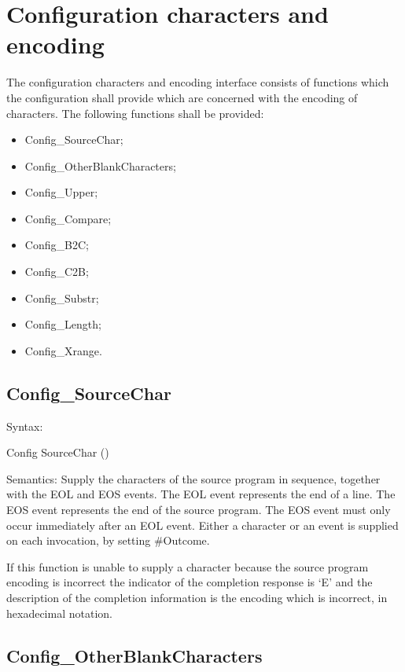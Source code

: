 \hypertarget{configuration-characters-and-encoding}{%
\section{Configuration characters and
encoding}\label{configuration-characters-and-encoding}}

The configuration characters and encoding interface consists of
functions which the configuration shall provide which are concerned with
the encoding of characters. The following functions shall be provided:

\begin{itemize}
\item
  Config\_SourceChar;
\item
  Config\_OtherBlankCharacters;
\item
  Config\_Upper;
\item
  Config\_Compare;
\item
  Config\_B2C;
\item
  Config\_C2B;
\item
  Config\_Substr;
\item
  Config\_Length;
\item
  Config\_Xrange.
\end{itemize}

\hypertarget{config_sourcechar}{%
\subsection{Config\_SourceChar}\label{config_sourcechar}}

Syntax:

Config SourceChar ()

Semantics: Supply the characters of the source program in sequence,
together with the EOL and EOS events. The EOL event represents the end
of a line. The EOS event represents the end of the source program. The
EOS event must only occur immediately after an EOL event. Either a
character or an event is supplied on each invocation, by setting
\#Outcome.

If this function is unable to supply a character because the source
program encoding is incorrect the indicator of the completion response
is `E' and the description of the completion information is the encoding
which is incorrect, in hexadecimal notation.

\hypertarget{config_otherblankcharacters}{%
\subsection{Config\_OtherBlankCharacters}\label{config_otherblankcharacters}}

